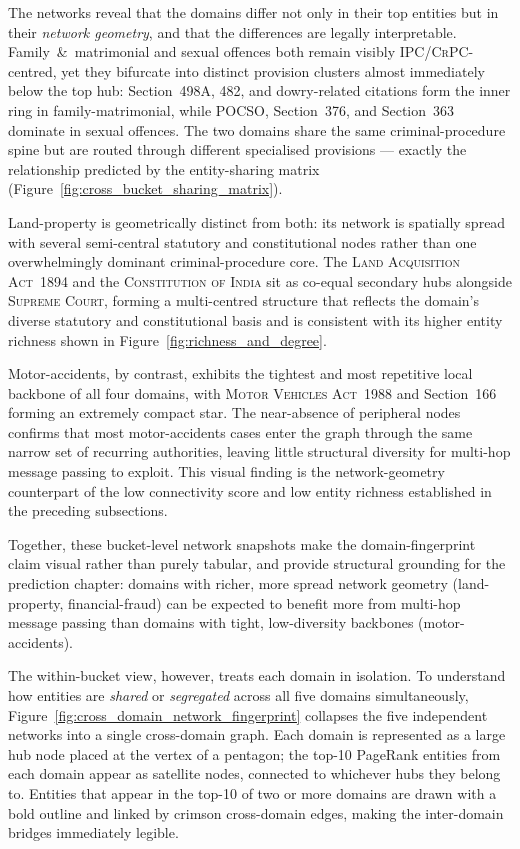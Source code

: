 The networks reveal that the domains differ not only in their top entities but in
their \emph{network geometry}, and that the differences are legally interpretable.
Family~\&~matrimonial and sexual offences both remain visibly
\textsc{IPC}/\textsc{CrPC}-centred, yet they bifurcate into distinct provision
clusters almost immediately below the top hub: Section~498A, 482, and
dowry-related citations form the inner ring in family-matrimonial, while
\textsc{POCSO}, Section~376, and Section~363 dominate in sexual offences. The
two domains share the same criminal-procedure spine but are routed through
different specialised provisions — exactly the relationship predicted by the
entity-sharing matrix (Figure~\ref{fig:cross_bucket_sharing_matrix}).

Land-property is geometrically distinct from both: its network is spatially
spread with several semi-central statutory and constitutional nodes rather than
one overwhelmingly dominant criminal-procedure core. The \textsc{Land Acquisition
Act~1894} and the \textsc{Constitution of India} sit as co-equal secondary hubs
alongside \textsc{Supreme Court}, forming a multi-centred structure that reflects
the domain's diverse statutory and constitutional basis and is consistent with
its higher entity richness shown in Figure~\ref{fig:richness_and_degree}.

Motor-accidents, by contrast, exhibits the tightest and most repetitive local
backbone of all four domains, with \textsc{Motor Vehicles Act~1988} and
Section~166 forming an extremely compact star. The near-absence of peripheral
nodes confirms that most motor-accidents cases enter the graph through the same
narrow set of recurring authorities, leaving little structural diversity for
multi-hop message passing to exploit. This visual finding is the network-geometry
counterpart of the low connectivity score and low entity richness established in
the preceding subsections.

Together, these bucket-level network snapshots make the domain-fingerprint claim
visual rather than purely tabular, and provide structural grounding for the
prediction chapter: domains with richer, more spread network geometry (land-property,
financial-fraud) can be expected to benefit more from multi-hop message passing
than domains with tight, low-diversity backbones (motor-accidents).

The within-bucket view, however, treats each domain in isolation. To understand
how entities are \emph{shared} or \emph{segregated} across all five domains
simultaneously, Figure~\ref{fig:cross_domain_network_fingerprint} collapses the
five independent networks into a single cross-domain graph. Each domain is
represented as a large hub node placed at the vertex of a pentagon; the top-10
PageRank entities from each domain appear as satellite nodes, connected to
whichever hubs they belong to. Entities that appear in the top-10 of two or more
domains are drawn with a bold outline and linked by crimson cross-domain edges,
making the inter-domain bridges immediately legible.

